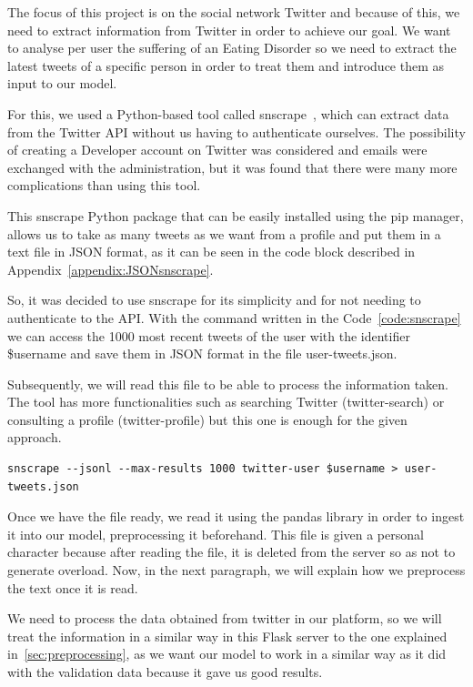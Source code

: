 The focus of this project is on the social network Twitter and because of this, we need to extract information from Twitter in order to achieve our goal. We want to analyse per user the suffering of an Eating Disorder so we need to extract the latest tweets of a specific person in order to treat them and introduce them as input to our model.

For this, we used a Python-based tool called snscrape~\cite{JustAnot83:online}, which can extract data from the Twitter API without us having to authenticate ourselves. The possibility of creating a Developer account on Twitter was considered and emails were exchanged with the administration, but it was found that there were many more complications than using this tool. 

This snscrape Python package that can be easily installed using the pip manager, allows us to take as many tweets as we want from a profile and put them in a text file in JSON format, as it can be seen in the code block described in Appendix~\ref{appendix:JSONsnscrape}.

So, it was decided to use snscrape for its simplicity and for not needing to authenticate to the API. With the command written in the Code~\ref{code:snscrape} we can access the 1000 most recent tweets of the user with the identifier \$username and save them in JSON format in the file user-tweets.json.

Subsequently, we will read this file to be able to process the information taken. The tool has more functionalities such as searching Twitter (twitter-search) or consulting a profile (twitter-profile) but this one is enough for the given approach.

\begin{lstlisting}[caption={Command executed for obtaining tweets}, label={code:snscrape}]
snscrape --jsonl --max-results 1000 twitter-user $username > user-tweets.json
\end{lstlisting}

Once we have the file ready, we read it using the pandas library in order to ingest it into our model, preprocessing it beforehand. This file is given a personal character because after reading the file, it is deleted from the server so as not to generate overload. Now, in the next paragraph, we will explain how we preprocess the text once it is read.

We need to process the data obtained from twitter in our platform, so we will treat the information in a similar way in this Flask server to the one explained in~\ref{sec:preprocessing}, as we want our model to work in a similar way as it did with the validation data because it gave us good results. 



